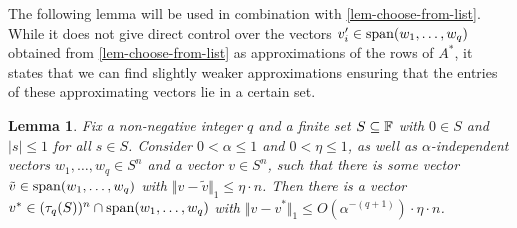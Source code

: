 \documentclass{daj}
\theoremstyle{plain}
\theoremstyle{plain}
\newtheorem{lem}[thm]{Lemma}
\theoremstyle{plain}
\theoremstyle{plain}
\theoremstyle{definition}
\theoremstyle{plain}
\theoremstyle{plain}
\theoremstyle{definition}
\theoremstyle{definition}
\theoremstyle{plain}
\begin{document}
The following lemma will be used in combination with \cref{lem-choose-from-list}. While it does not give direct control over the vectors $v_i'\in \operatorname{span}(w_1,\dots,w_q)$ obtained from \cref{lem-choose-from-list} as approximations of the rows of $A^*$, it states that we can find slightly weaker approximations ensuring that the entries of these approximating vectors lie in a certain set.

\begin{lem}\label{lem-lin-comb-in-tau-close}
Fix a non-negative integer $q$ and a finite set $S\subseteq \mathbb{F}$ with $0\in S$ and $\vert s\vert\leq 1$ for all $s\in S$. Consider $0<\alpha\leq 1$ and $0<\eta\leq 1$, as well as $\alpha$-independent vectors $w_1,\dots,w_q\in S^n$ and a vector $v\in S^n$, such that there is some vector $\tilde{v}\in \operatorname{span}(w_1,\dots,w_q)$ with $\Vert v-\tilde{v}\Vert_1\leq \eta\cdot n$. Then there is a vector $v^*\in (\tau_{q}(S))^n\cap \operatorname{span}(w_1,\dots,w_q)$ with $\Vert v-v^*\Vert_1\leq O(\alpha^{-(q+1)})\cdot \eta \cdot n$.
\end{lem}
\end{document}
